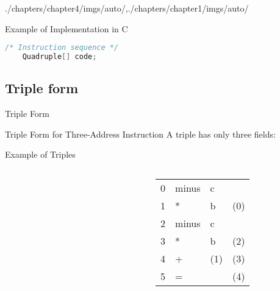 \begin{graphicspathcontext}{{./chapters/chapter4/imgs/auto/},{./chapters/chapter1/imgs/auto/}}
\begin{bibunit}[apalike]
\begin{frame}[background=6,fragile]{Example of Implementation in C}
\begin{lstlisting}[language=C++,basicstyle=\scriptsize]
	/* Instruction sequence */
	Quadruple[] code;
	\end{lstlisting}
\end{frame}

\subsection{Triple form}
\subsectiontableofcontentslide

\begin{frame}{Triple Form}
	\vspace{.25cm}
	\begin{definitionblock}{Triple Form for Three-Address Instruction}
		A triple has only three fields:
		\begin{center}
		\end{center}
	\end{definitionblock}
	\vspace{.25cm}
\end{frame}

\begin{frame}[background=8]{Example of Triples}
	\begin{columns}
		\begin{column}{.45\linewidth}
			\begin{tac}[\linewidth]
			\end{tac}
		\end{column}
		\begin{column}{.1\linewidth}
		\end{column}
		\begin{column}{.45\linewidth}
			\begin{tabularx}{\linewidth}{|c|X|X|X|}
			\hline
			\tabularheading&\chead{op}&\chead{arg$_1$}&\chead{arg$_2$}\\
			\hline
			0 & minus & c & \\
			\hline
			1 & * & b & (0) \\
			\hline
			2 & minus & c & \\
			\hline
			3 & * & b & (2) \\
			\hline
			4 & + & (1) & (3) \\
			\hline
			5 & = & \tactext{a} & (4) \\
			\hline
			\end{tabularx}
		\end{column}
	\end{columns}
\end{frame}


\end{bibunit}
\end{graphicspathcontext}
